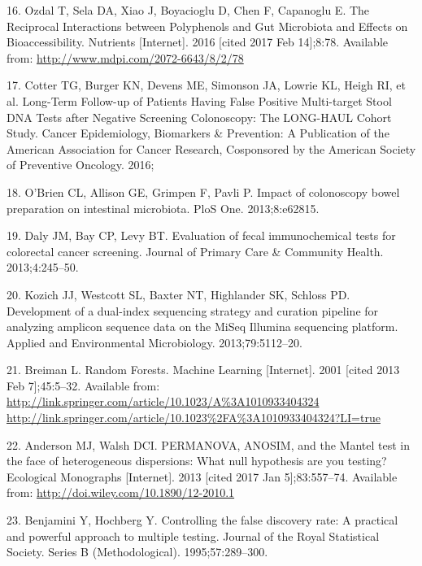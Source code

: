 \documentclass[12pt,]{article}
\begin{document}
\hypertarget{ref-ozdal_reciprocal_2016}{}
16. Ozdal T, Sela DA, Xiao J, Boyacioglu D, Chen F, Capanoglu E. The
Reciprocal Interactions between Polyphenols and Gut Microbiota and
Effects on Bioaccessibility. Nutrients {[}Internet{]}. 2016 {[}cited
2017 Feb 14{]};8:78. Available from:
\url{http://www.mdpi.com/2072-6643/8/2/78}

\hypertarget{ref-cotter_long-term_2016}{}
17. Cotter TG, Burger KN, Devens ME, Simonson JA, Lowrie KL, Heigh RI,
et al. Long-Term Follow-up of Patients Having False Positive
Multi-target Stool DNA Tests after Negative Screening Colonoscopy: The
LONG-HAUL Cohort Study. Cancer Epidemiology, Biomarkers \& Prevention: A
Publication of the American Association for Cancer Research, Cosponsored
by the American Society of Preventive Oncology. 2016;

\hypertarget{ref-obrien_impact_2013}{}
18. O'Brien CL, Allison GE, Grimpen F, Pavli P. Impact of colonoscopy
bowel preparation on intestinal microbiota. PloS One. 2013;8:e62815.

\hypertarget{ref-daly_evaluation_2013}{}
19. Daly JM, Bay CP, Levy BT. Evaluation of fecal immunochemical tests
for colorectal cancer screening. Journal of Primary Care \& Community
Health. 2013;4:245--50.

\hypertarget{ref-kozich_development_2013}{}
20. Kozich JJ, Westcott SL, Baxter NT, Highlander SK, Schloss PD.
Development of a dual-index sequencing strategy and curation pipeline
for analyzing amplicon sequence data on the MiSeq Illumina sequencing
platform. Applied and Environmental Microbiology. 2013;79:5112--20.

\hypertarget{ref-breiman_random_2001}{}
21. Breiman L. Random Forests. Machine Learning {[}Internet{]}. 2001
{[}cited 2013 Feb 7{]};45:5--32. Available from:
\href{http://link.springer.com/article/10.1023/A\%3A1010933404324\%20http://link.springer.com/article/10.1023\%2FA\%3A1010933404324?LI=true}{http://link.springer.com/article/10.1023/A\%3A1010933404324 http://link.springer.com/article/10.1023\%2FA\%3A1010933404324?LI=true}

\hypertarget{ref-anderson_permanova_2013}{}
22. Anderson MJ, Walsh DCI. PERMANOVA, ANOSIM, and the Mantel test in
the face of heterogeneous dispersions: What null hypothesis are you
testing? Ecological Monographs {[}Internet{]}. 2013 {[}cited 2017 Jan
5{]};83:557--74. Available from:
\url{http://doi.wiley.com/10.1890/12-2010.1}

\hypertarget{ref-benjamini_controlling_1995}{}
23. Benjamini Y, Hochberg Y. Controlling the false discovery rate: A
practical and powerful approach to multiple testing. Journal of the
Royal Statistical Society. Series B (Methodological). 1995;57:289--300.
\end{document}
